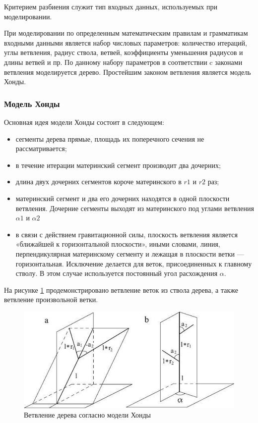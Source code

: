 \documentclass[54pt, a4paper]{article}
\begin{document}
	Критерием разбиения служит тип входных данных, используемых при моделировании.
	
	При моделировании по определенным математическим правилам и грамматикам входными данными является набор числовых параметров: количество итераций, углы ветвления, радиус ствола, ветвей, коэффициенты уменьшения радиусов и длины ветвей и пр. По данному набору параметров в соответствии c законами ветвления моделируется дерево. Простейшим законом ветвления является модель Хонды.
	
	\subsubsection{Модель Хонды}
	
	Основная идея модели Хонды состоит в следующем:

	\begin{itemize}
		\item сегменты дерева прямые, площадь их поперечного сечения не рассматривается;
		\item в течение итерации материнский сегмент производит два дочерних;

		\item длина двух дочерних сегментов короче материнского в $r1$ и $r2$ раз;

		\item материнский сегмент и два его дочерних находятся в одной плоскости ветвления. Дочерние сегменты выходят из материнского под углами ветвления $\alpha1$ и $\alpha2$
		\item в связи с действием гравитационной силы, плоскость ветвления является «ближайшей к горизонтальной плоскости», иными словами, линия, перпендикулярная материнскому сегменту и лежащая в плоскости ветки — горизонтальная. Исключение делается для веток, присоединенных к главному стволу. В этом случае используется постоянный угол расхождения $\alpha$.
	\end{itemize}

	На рисунке \ref{ris:honda} продемонстрировано ветвление веток из ствола дерева, а также ветвление произвольной ветки.

	\begin{figure}[ht!]
		\centering
		\includegraphics[scale=1]{img/honda.png}
		\caption{Ветвление дерева согласно модели Хонды}
		\label{ris:honda}
	\end{figure}
\end{document}
